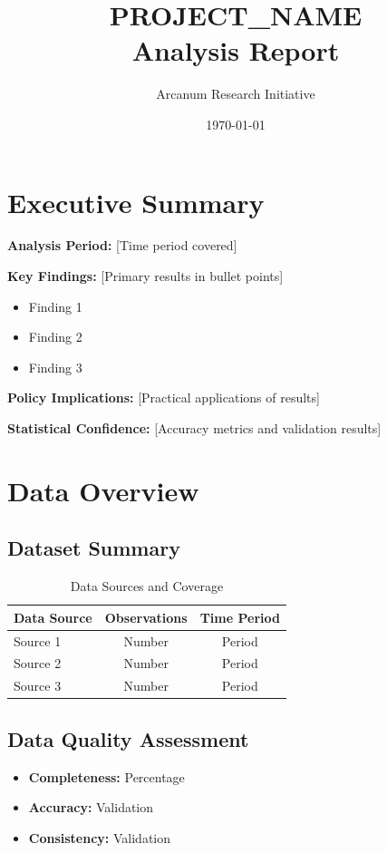 \documentclass[11pt,letterpaper]{article}
\title{\textbf{PROJECT_NAME}\\Analysis Report}
\author{Arcanum Research Initiative}
\date{\today}
\begin{document}
\maketitle

\tableofcontents
\newpage

\section{Executive Summary}

\textbf{Analysis Period:} [Time period covered]

\textbf{Key Findings:} [Primary results in bullet points]
\begin{itemize}
    \item Finding 1
    \item Finding 2
    \item Finding 3
\end{itemize}

\textbf{Policy Implications:} [Practical applications of results]

\textbf{Statistical Confidence:} [Accuracy metrics and validation results]

\section{Data Overview}

\subsection{Dataset Summary}
\begin{table}
\centering
\begin{tabular}{@{}lcc@{}}
\toprule
\textbf{Data Source} & \textbf{Observations} & \textbf{Time Period} \\
\midrule
Source 1 & Number & Period \\
Source 2 & Number & Period \\
Source 3 & Number & Period \\
\bottomrule
\end{tabular}
\caption{Data Sources and Coverage}
\end{table}

\subsection{Data Quality Assessment}
\begin{itemize}
    \item \textbf{Completeness:} Percentage
    \item \textbf{Accuracy:} Validation
    \item \textbf{Consistency:} Validation
\end{itemize}
\end{document}
